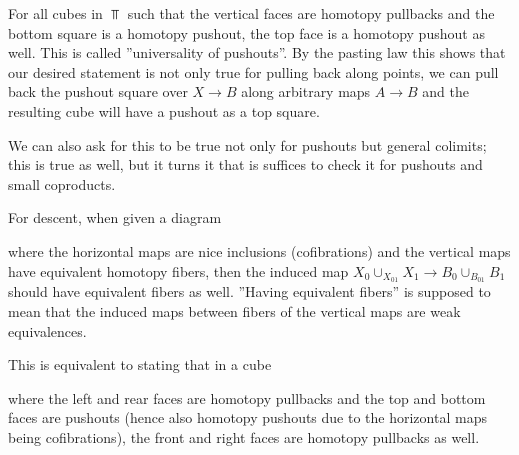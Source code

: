 For all cubes in $\Top$ such that the vertical faces are homotopy pullbacks and the bottom square is a homotopy pushout, the top face is a homotopy pushout as well.
This is called  ''universality of pushouts''.
By the pasting law this shows that our desired statement is not only true for pulling back along points, we can pull back the pushout square over $X\to B$ along arbitrary maps $A\to B$ and the resulting cube will have a pushout as a top square.

We can also ask for this to be true not only for pushouts but general colimits; this is true as well, but it turns it that is suffices to check it for pushouts and small coproducts.

For descent, when given a diagram 
\begin{center}
\end{center}
where the horizontal maps are nice inclusions (cofibrations) and the vertical maps have equivalent homotopy fibers, then the induced map $X_0\cup_{X_{01}}X_1\to B_0\cup_{B_{01}}B_1$ should have equivalent fibers as well.
''Having equivalent fibers'' is supposed to mean that the induced maps between fibers of the vertical maps are weak equivalences.

This is equivalent to stating that in a cube 
\begin{center}
\end{center}
where the left and rear faces are homotopy pullbacks and the top and bottom faces are pushouts (hence also homotopy pushouts due to the horizontal maps being cofibrations), the front and right faces are homotopy pullbacks as well.

